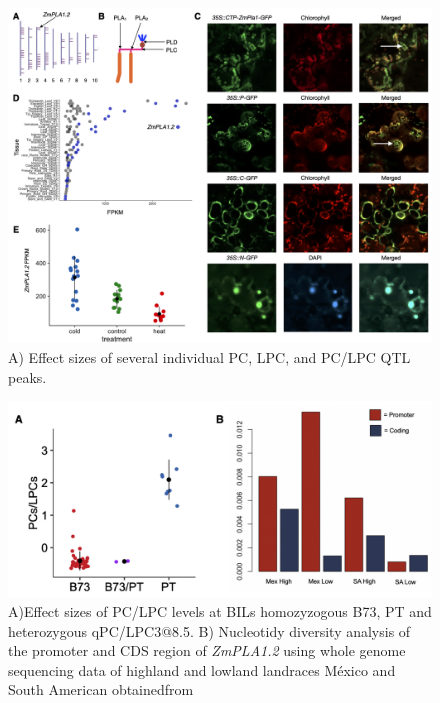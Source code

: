 \documentclass[9pt,twocolumn,twoside,lineno]{BioRxiv}
\begin{document}
\begin{figure}[t]
\begin{center}
\includegraphics[width=0.8\paperwidth]{Sup_Figures/Sup_Fig_4.png}
\caption{A) Effect sizes of several individual PC, LPC, and PC/LPC QTL peaks.
}
\label{SupFig3}
\end{center}
\end{figure} 

\begin{figure}[t]
\begin{center}
\includegraphics[width=0.8\paperwidth]{Sup_Figures/Sup_Fig_5.png}
\caption{A)Effect sizes of PC/LPC levels at BILs homozyzogous B73, PT and heterozygous qPC/LPC3@8.5.
B) Nucleotidy diversity analysis of the promoter and CDS region of \textit{ZmPLA1.2} using whole genome sequencing data of highland and lowland landraces México and South American obtainedfrom \cite{Wang2017-bc}
}
\label{SupFig6}
\end{center}
\end{figure} 
\end{document}
